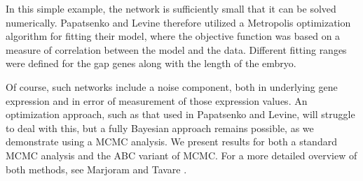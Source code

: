 In this simple example, the network is sufficiently small that it can be solved numerically. Papatsenko and Levine therefore utilized a Metropolis optimization algorithm for fitting their model, where the objective function was based on a measure of correlation between the model and the data. Different fitting ranges were defined for the gap genes along with the length of the embryo.

Of course, such networks include a noise component, both in underlying gene expression and in error of measurement of those expression values. An optimization approach, such as that used in Papatsenko and Levine, will struggle to deal with this, but a fully Bayesian approach remains possible, as we demonstrate using a MCMC analysis. We present results for both a standard MCMC analysis and the ABC variant of MCMC. For a more detailed overview of both methods, see Marjoram and Tavare \cite{Marjoram2006}.

